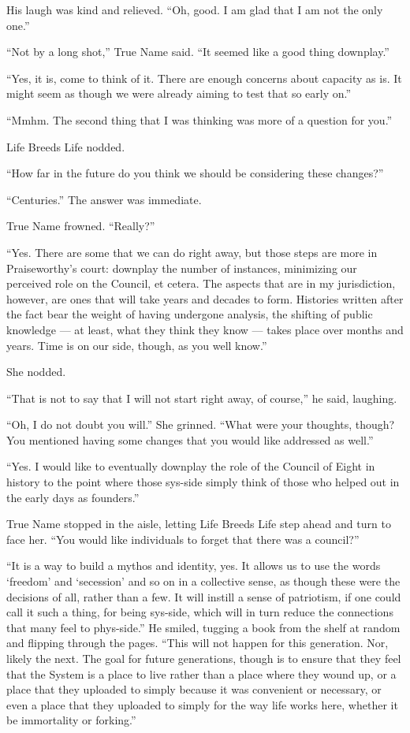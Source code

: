 His laugh was kind and relieved. ``Oh, good. I am glad that I am not the only one.''

``Not by a long shot,'' True Name said. ``It seemed like a good thing downplay.''

``Yes, it is, come to think of it. There are enough concerns about capacity as is. It might seem as though we were already aiming to test that so early on.''

``Mmhm. The second thing that I was thinking was more of a question for you.''

Life Breeds Life nodded.

``How far in the future do you think we should be considering these changes?''

``Centuries.'' The answer was immediate.

True Name frowned. ``Really?''

``Yes. There are some that we can do right away, but those steps are more in Praiseworthy's court: downplay the number of instances, minimizing our perceived role on the Council, et cetera. The aspects that are in my jurisdiction, however, are ones that will take years and decades to form. Histories written after the fact bear the weight of having undergone analysis, the shifting of public knowledge — at least, what they think they know — takes place over months and years. Time is on our side, though, as you well know.''

She nodded.

``That is not to say that I will not start right away, of course,'' he said, laughing.

``Oh, I do not doubt you will.'' She grinned. ``What were your thoughts, though? You mentioned having some changes that you would like addressed as well.''

``Yes. I would like to eventually downplay the role of the Council of Eight in history to the point where those sys-side simply think of those who helped out in the early days as founders.''

True Name stopped in the aisle, letting Life Breeds Life step ahead and turn to face her. ``You would like individuals to forget that there was a council?''

``It is a way to build a mythos and identity, yes. It allows us to use the words `freedom' and `secession' and so on in a collective sense, as though these were the decisions of all, rather than a few. It will instill a sense of patriotism, if one could call it such a thing, for being sys-side, which will in turn reduce the connections that many feel to phys-side.'' He smiled, tugging a book from the shelf at random and flipping through the pages. ``This will not happen for this generation. Nor, likely the next. The goal for future generations, though is to ensure that they feel that the System is a place to live rather than a place where they wound up, or a place that they uploaded to simply because it was convenient or necessary, or even a place that they uploaded to simply for the way life works here, whether it be immortality or forking.''

